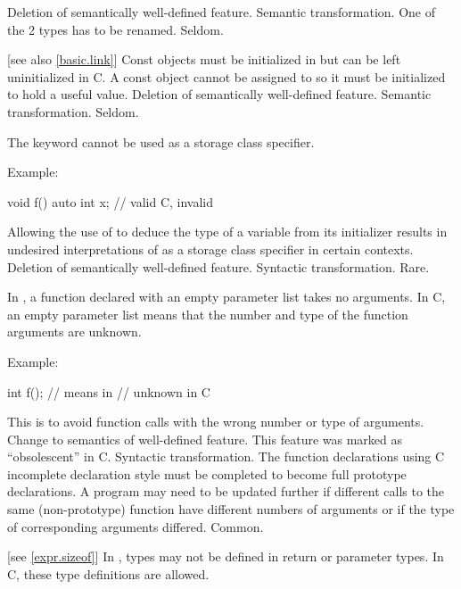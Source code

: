 \effect
Deletion of semantically well-defined feature.
\difficulty
Semantic transformation.
One of the 2 types has to be renamed.
\howwide
Seldom.

 [see also \ref{basic.link}]
\change
Const objects must be initialized in \Cpp{} but can be left uninitialized in C.
\rationale
A const object cannot be assigned to so it must be initialized
to hold a useful value.
\effect
Deletion of semantically well-defined feature.
\difficulty
Semantic transformation.
\howwide
Seldom.

\change
The keyword  cannot be used as a storage class specifier.

Example:
\begin{codeblock}
void f() {
  auto int x;       // valid C, invalid \Cpp{}
}
\end{codeblock}

\rationale
Allowing the use of  to deduce the type
of a variable from its initializer results in undesired interpretations of
 as a storage class specifier in certain contexts.
\effect
Deletion of semantically well-defined feature.
\difficulty
Syntactic transformation.
\howwide
Rare.

\change
In \Cpp{}, a function declared with an empty parameter list takes no arguments.
In C, an empty parameter list means that the number and type of the function arguments are unknown.

Example:
\begin{codeblock}
int f();            // means    in \Cpp{}
                    //  unknown \tcode{)} in C
\end{codeblock}

\rationale
This is to avoid function calls
with the wrong number or type of arguments.
\effect
Change to semantics of well-defined feature.
This feature was marked as ``obsolescent'' in C.
\difficulty
Syntactic transformation.
The function declarations using C incomplete declaration style must
be completed to become full prototype declarations.
A program may need to be updated further if different calls to the
same (non-prototype) function have different numbers of arguments or
if the type of corresponding arguments differed.
\howwide
Common.

 [see \ref{expr.sizeof}]
\change
In \Cpp{}, types may not be defined in return or parameter types.
In C, these type definitions are allowed.


